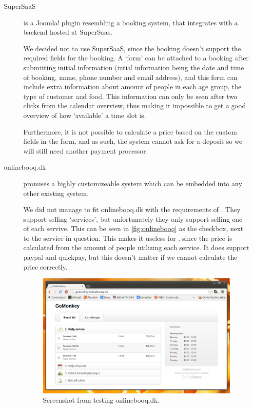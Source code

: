 \begin{description}
\item[SuperSaaS] is a Joomla! plugin resembling a booking system, that integrates with a 
backend hosted at SuperSaas.

We decided not to use SuperSaaS, since the booking doesn’t support the required 
fields for the booking. A `form' can be attached to a booking after submitting 
initial information (intial information being the date and time of booking, 
name, phone number and email address), and this 
form can include extra information about amount of people in each age group, the
type of customer and food. This information can only be seen after two clicks 
from the calendar overview, thus making it impossible to get a good overview of 
how `available' a time slot is.

Furthermore, it is not possible to calculate a price based on the custom fields 
in the form, and as such, the system cannot ask for a deposit so we will still 
need another payment processor.

\item[onlinebooq.dk] promises a highly customizeable system which can be embedded into
any other existing system.

We did not manage to fit onlinebooq.dk with the requirements of \gomonkey{}.
They support selling 
`services', but unfortunately they only support selling one of each servive.
This can be seen in \autoref{fig:onlinebooq} as the checkbox, next to the 
service in question. This makes it useless for \gomonkey{}, since the price is 
calculated from the amount of people utilizing each service. It does support 
paypal and quickpay, but this doesn't matter if we cannot calculate the price 
correctly.

\begin{figure}[htbp]
    \centering
        \includegraphics[width=1\textwidth]{figures/onlinebooq.png}
	    \caption{Screenshot from testing onlinebooq.dk.}
        \label{fig:onlinebooq}
\end{figure}
		


\end{description}
